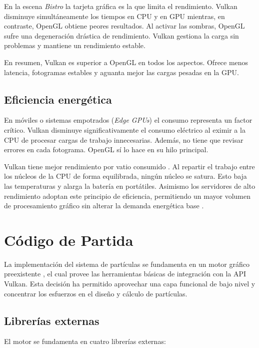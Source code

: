 En la escena \textit{Bistro} la tarjeta gráfica es la que limita el rendimiento. Vulkan disminuye simultáneamente los tiempos en CPU y en GPU mientras, en contraste, OpenGL obtiene peores resultados. 
Al activar las sombras, OpenGL sufre una degeneración drástica de rendimiento. Vulkan gestiona la carga sin problemas y mantiene un rendimiento estable.

En resumen, Vulkan es superior a OpenGL en todos los aspectos. Ofrece menos latencia, fotogramas estables y aguanta mejor las cargas pesadas en la GPU.


\subsection{Eficiencia energética}

En móviles o sistemas empotrados (\textit{Edge GPUs}) el consumo representa un factor crítico. Vulkan disminuye significativamente el consumo eléctrico al eximir a la CPU de procesar cargas de trabajo innecesarias. 
Además, no tiene que revisar errores en cada fotograma. OpenGL sí lo hace en su hilo principal.
 
 
Vulkan tiene mejor rendimiento por vatio consumido \parencite{9655285}. 
Al repartir el trabajo entre los núcleos de la CPU de forma equilibrada, ningún núcleo se satura. 
Esto baja las temperaturas y  alarga la batería en portátiles. Asimismo los servidores de alto rendimiento adoptan este principio de eficiencia, permitiendo un mayor volumen de procesamiento gráfico sin alterar la demanda energética base \parencite{8685588}. 



\section{Código de Partida}

La implementación del sistema de partículas se fundamenta en un motor gráfico preexistente \parencite{moreno_gii_ao}, el cual provee las herramientas básicas de integración con la API Vulkan.
Esta decisión ha permitido aprovechar una capa funcional de bajo nivel y concentrar los esfuerzos en el diseño y cálculo de partículas.



\subsection{Librerías externas}

\noindent El motor se fundamenta en cuatro librerías externas:

